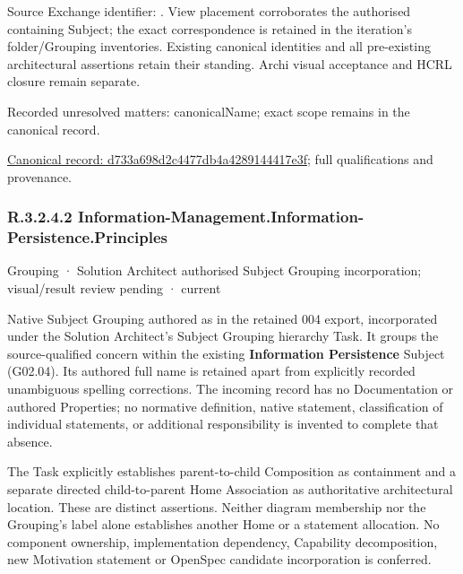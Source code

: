 Source Exchange identifier: \texttt{}. View placement corroborates
the authorised containing Subject; the exact correspondence is retained in the
iteration's folder/Grouping inventories. Existing canonical identities and all
pre-existing architectural assertions retain their standing. Archi visual
acceptance and HCRL closure remain separate.


{\small Recorded unresolved matters: canonicalName; exact scope remains in the canonical record.}\par
{\footnotesize \href{../../../../continuum/grouping/d733a698d2c4477db4a4289144417e3f.md}{Canonical record: d733a698d2c4477db4a4289144417e3f}; full qualifications and provenance.}\par
\subsubsection*{R.3.2.4.2 Information-Management.Information-Persistence.Principles}
\label{navigation:R.3.2.4.2}

\label{element:a5228e483703437ba7617034e4ea207f}
{\small Grouping · Solution Architect authorised Subject Grouping incorporation; visual/result review pending · current}\par

Native Subject Grouping authored as \texttt{} in the retained 004 export,
incorporated under the Solution Architect's Subject Grouping hierarchy Task.
It groups the source-qualified \texttt{} concern within
the existing \textbf{Information Persistence} Subject (G02.04). Its authored full name
is retained apart from explicitly recorded unambiguous spelling corrections.
The incoming record has no Documentation or authored Properties; no normative
definition, native statement, classification of individual statements, or
additional responsibility is invented to complete that absence.



The Task explicitly establishes parent-to-child Composition as containment and
a separate directed child-to-parent Home Association as authoritative architectural
location. These are distinct assertions. Neither diagram membership nor the
Grouping's label alone establishes another Home or a statement allocation.
No component ownership, implementation dependency, Capability decomposition,
new Motivation statement or OpenSpec candidate incorporation is conferred.



